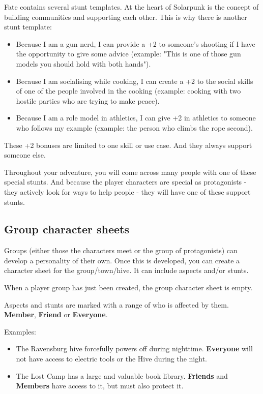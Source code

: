 Fate contains several stunt templates. At the heart of Solarpunk is the concept of building communities and supporting each other. This is why there is another stunt template:

\begin{itemize}
    \item Because I am a gun nerd, I can provide a +2 to someone's shooting if I have the opportunity to give some advice (example: "This is one of those gun models you should hold with both hands").
    \item Because I am socialising while cooking, I can create a +2 to the social skills of one of the people involved in the cooking (example: cooking with two hostile parties who are trying to make peace).
    \item Because I am a role model in athletics, I can give +2 in athletics to someone who follows my example (example: the person who climbs the rope second).
\end{itemize}

These +2 bonuses are limited to one skill or use case. And they always support someone else.

Throughout your adventure, you will come across many people with one of these special stunts. And because the player characters are special as protagonists - they actively look for ways to help people - they will have one of these support stunts.


\subsection{Group character sheets}

Groups (either those the characters meet or the group of protagonists) can develop a personality of their own. Once this is developed, you can create a character sheet for the group/town/hive. It can include aspects and/or stunts.

When a player group has just been created, the group character sheet is empty.

Aspects and stunts are marked with a range of who is affected by them. \textbf{Member}, \textbf{Friend} or \textbf{Everyone}.

Examples:
\begin{itemize}
    \item The Ravensburg hive forcefully powers off during nighttime. \textbf{Everyone} will not have access to electric tools or the Hive during the night.
    \item The Lost Camp has a large and valuable book library. \textbf{Friends} and \textbf{Members} have access to it, but must also protect it.
\end{itemize}


